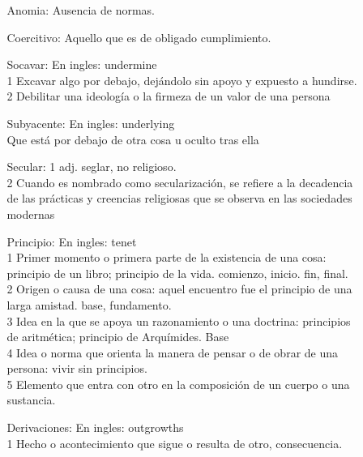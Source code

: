 \begin{enumerate}
\item[ ]  
\begin{enumerate}
\item[ ] 
\begin{enumerate}
	\item[Anomia:] Ausencia de normas. \\
	\item[Coercitivo:] Aquello que es de obligado cumplimiento.\\
	\item[Socavar:]		En ingles: undermine\\
				1   Excavar algo por debajo, dej\'andolo sin apoyo y expuesto a hundirse.\\
				2   Debilitar una ideolog\'ia o la firmeza de un valor de una persona	\\
	\item[Subyacente:]      En ingles: underlying\\
				Que est\'a por debajo de otra cosa u oculto tras ella\\
	\item[Secular:]   	1 adj. seglar, no religioso.\\
				2 Cuando es nombrado como secularizaci\'on, se refiere a la decadencia de las pr\'acticas y creencias religiosas que se observa en las sociedades modernas\\
	\item[Principio:]      En ingles:  tenet\\
				1   Primer momento o primera parte de la existencia de una cosa: principio de un libro; principio de la vida.  comienzo, inicio.  fin, final.\\
				2   Origen o causa de una cosa: aquel encuentro fue el principio de una larga amistad. base, fundamento.\\
				3   Idea en la que se apoya un razonamiento o una doctrina: principios de aritm\'etica; principio de Arqu\'imides. Base\\
				4   Idea o norma que orienta la manera de pensar o de obrar de una persona: vivir sin principios.\\
				5   Elemento que entra con otro en la composici\'on de un cuerpo o una sustancia. \\
	\item[Derivaciones:]    En ingles: outgrowths\\
				1   Hecho o acontecimiento que sigue o resulta de otro, consecuencia.\\

\end{enumerate}
\end{enumerate}
\end{enumerate}
